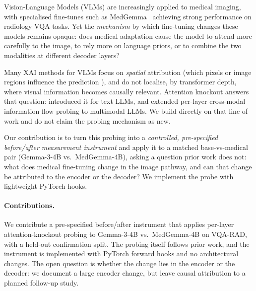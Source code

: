 Vision-Language Models (VLMs) are increasingly applied to medical imaging, with
specialised fine-tunes such as MedGemma~\citep{medgemma2025} achieving strong
performance on radiology VQA tasks. Yet the \emph{mechanism} by which fine-tuning
changes these models remains opaque: does medical adaptation cause the model to
attend more carefully to the image, to rely more on language priors, or to combine
the two modalities at different decoder layers?

Many XAI methods for VLMs focus on \emph{spatial} attribution (which pixels or
image regions influence the prediction \citep{selvaraju2017gradcam,chefer2021transformer}), and do not localise, by transformer depth, where visual information becomes
causally relevant. Attention knockout answers that question: \citet{geva2023dissecting}
introduced it for text LLMs, and \citet{zhang2025crossmodal} extended per-layer
cross-modal information-flow probing to multimodal LLMs. We build directly on that line
of work and do not claim the probing mechanism as new.

Our contribution is to turn this probing into a \emph{controlled, pre-specified
before/after measurement instrument} and apply it to a matched base-vs-medical pair
(Gemma-3-4B vs.\ MedGemma-4B), asking a question prior work does not: what does medical
fine-tuning change in the image pathway, and can that change be attributed to the
encoder or the decoder? We implement the probe with lightweight PyTorch hooks.

\paragraph{Contributions.}
We contribute a pre-specified before/after instrument that applies per-layer
attention-knockout probing to Gemma-3-4B vs.\ MedGemma-4B on VQA-RAD, with a held-out
confirmation split. The probing itself follows prior work, and the instrument is
implemented with PyTorch forward hooks and no architectural changes. The open question
is whether the change lies in the encoder or the decoder: we document a large encoder
change, but leave causal attribution to a planned follow-up study.
